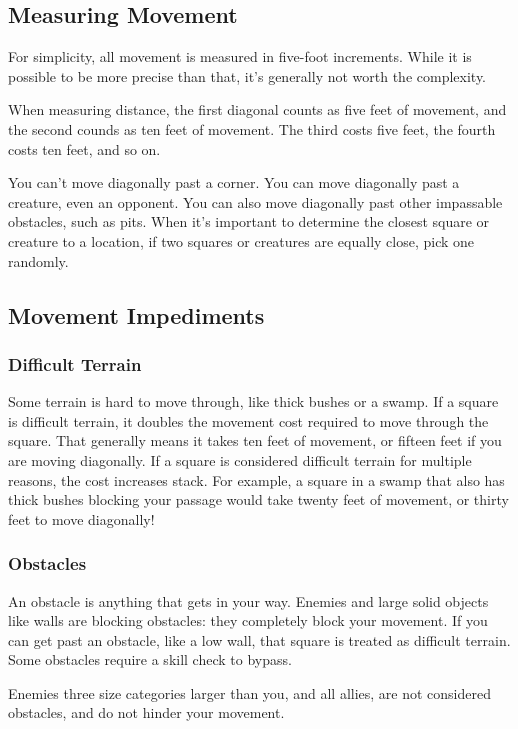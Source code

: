\subsection{Measuring Movement}
For simplicity, all movement is measured in five-foot increments. While it is possible to be more precise than that, it's generally not worth the complexity.

 When measuring distance, the first diagonal counts as five feet of movement, and the second counds as ten feet of movement. The third costs five feet, the fourth costs ten feet, and so on.

You can't move diagonally past a corner. You can move diagonally past a creature, even an opponent. You can also move diagonally past other impassable obstacles, such as pits.
 When it's important to determine the closest square or creature to a location, if two squares or creatures are equally close, pick one randomly.

\subsection{Movement Impediments}

\subsubsection{Difficult Terrain}
Some terrain is hard to move through, like thick bushes or a swamp. If a square is difficult terrain, it doubles the movement cost required to move through the square. That generally means it takes ten feet of movement, or fifteen feet if you are moving diagonally. If a square is considered difficult terrain for multiple reasons, the cost increases stack. For example, a square in a swamp that also has thick bushes blocking your passage would take twenty feet of movement, or thirty feet to move diagonally!

\subsubsection{Obstacles}
An obstacle is anything that gets in your way. Enemies and large solid objects like walls are blocking obstacles: they completely block your movement. If you can get past an obstacle, like a low wall, that square is treated as difficult terrain. Some obstacles require a skill check to bypass.

Enemies three size categories larger than you, and all allies, are not considered obstacles, and do not hinder your movement.


